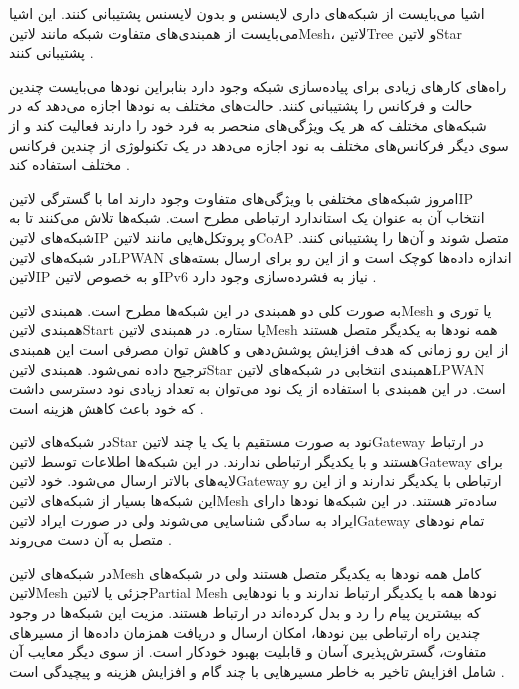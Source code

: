 
اشیا می‌بایست از شبکه‌های داری لایسنس و بدون لایسنس پشتیبانی کنند.
این اشیا می‌بایست از همبندی‌های متفاوت شبکه مانند ‌لاتین{Mesh}، ‌لاتین{Tree} و ‌لاتین{Star} پشتیبانی کنند
.

راه‌های کارهای زیادی برای پیاده‌سازی شبکه وجود دارد بنابراین نودها می‌بایست چندین حالت و فرکانس را پشتیبانی کنند.
حالت‌های مختلف به نودها اجازه می‌دهد که در شبکه‌های مختلف که هر یک ویژگی‌های منحصر به فرد خود را دارند
فعالیت کند و از سوی دیگر فرکانس‌های مختلف به نود اجازه می‌دهد در یک تکنولوژی از چندین فرکانس مختلف استفاده کند
.


امروز شبکه‌های مختلفی با ویژگی‌های متفاوت وجود دارند اما با گسترگی ‌لاتین{IP} انتخاب آن به عنوان
یک استاندارد ارتباطی مطرح است. شبکه‌ها تلاش می‌کنند تا به شبکه‌های ‌لاتین{IP} و پروتکل‌هایی مانند
‌لاتین{CoAP} متصل شوند و آن‌ها را پشتیبانی کنند.
در شبکه‌های ‌لاتین{LPWAN} اندازه داده‌ها کوچک است و از این رو برای ارسال بسته‌های ‌لاتین{IP} و
به خصوص ‌لاتین{IPv6} نیاز به فشرده‌سازی وجود دارد
.


به صورت کلی دو همبندی در این شبکه‌ها مطرح است. همبندی ‌لاتین{Mesh} یا توری
و همبندی ‌لاتین{Start} یا ستاره.
در همبندی ‌لاتین{Mesh} همه نودها به یکدیگر متصل هستند از این رو زمانی که هدف
افزایش پوشش‌دهی و کاهش توان مصرفی است این همبندی ترجیح داده نمی‌شود. همبندی
‌لاتین{Star} همبندی انتخابی در شبکه‌های ‌لاتین{LPWAN} است.
در این همبندی با استفاده از یک نود می‌توان به تعداد زیادی نود دسترسی داشت که
خود باعث کاهش هزینه است
.

در شبکه‌های ‌لاتین{Star} نود به صورت مستقیم با یک یا چند ‌لاتین{Gateway} در ارتباط هستند
و با یکدیگر ارتباطی ندارند. در این شبکه‌ها اطلاعات توسط ‌لاتین{Gateway} برای لایه‌های بالاتر ارسال می‌شود.
خود ‌لاتین{Gateway} ارتباطی با یکدیگر ندارند و از این رو این شبکه‌ها بسیار از شبکه‌های ‌لاتین{Mesh} ساده‌تر هستند.
در این شبکه‌ها نودها دارای ایراد به سادگی شناسایی می‌شوند ولی در صورت ایراد ‌لاتین{Gateway} تمام نودهای
متصل به آن دست می‌روند
.

در شبکه‌های ‌لاتین{Mesh} کامل همه نودها به یکدیگر متصل هستند ولی در شبکه‌های ‌لاتین{Mesh} جزئی یا ‌لاتین{Partial Mesh} نودها
همه با یکدیگر ارتباط ندارند و با نودهایی که بیشترین پیام را رد و بدل کرده‌اند در ارتباط هستند.
مزیت این شبکه‌ها در وجود چندین راه ارتباطی بین نودها، امکان ارسال و دریافت همزمان داده‌ها از مسیرهای متفاوت،
گسترش‌پذیری آسان و قابلیت بهبود خودکار است. از سوی دیگر معایب آن شامل افزایش تاخیر به خاطر مسیرهایی با چند گام و
افزایش هزینه و پیچیدگی است
.

